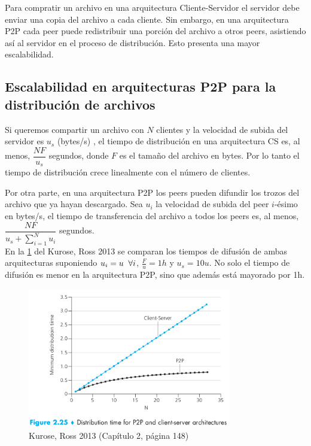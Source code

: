 \documentclass{article}
\begin{document}
Para compratir un archivo en una arquitectura Cliente-Servidor el
servidor debe enviar una copia del archivo a cada cliente. Sin
embargo, en una arquitectura P2P cada peer puede redistribuir una
porción del archivo a otros peers, asistiendo así al servidor en el
proceso de distribución. Esto presenta una mayor escalabilidad.

\subsection{Escalabilidad en arquitecturas P2P para la distribución de archivos}

Si queremos compartir un archivo con $N$ clientes y la velocidad de
subida del servidor es $u_s$ (bytes/s) , el tiempo de distribución en
una arquitectura CS es, al menos, $\dfrac{NF}{u_s}$ segundos, donde
$F$ es el tamaño del archivo en bytes. Por lo tanto el tiempo de
distribución crece linealmente con el número de clientes.

Por otra parte, en una arquitectura P2P los peers pueden difundir los trozos del archivo que ya hayan descargado. Sea $u_i$ la velocidad de subida del peer $i$-ésimo en bytes/s, el tiempo de transferencia del archivo a todos los peers es, al menos, $\dfrac{NF}{u_s+\sum\limits_{i=1}^{N}u_i}$ segundos.\\

En la \ref{fig:kurose,2.25} del Kurose, Ross 2013 se comparan los
tiempos de difusión de ambas arquitecturas suponiendo
$u_i=u \hspace{0.2cm} \forall i$, $\frac{F}{u} = 1 h$ y $u_s =
10u$. No solo el tiempo de difusión es menor en la arquitectura P2P,
sino que además está mayorado por 1h.  \vspace{-4mm}

\renewcommand\thefigure{Figura 2.25}
\begin{figure}[H]
  \centering
  \caption{Kurose, Ross 2013 (Capítulo 2, página 148)\vspace{-4mm}}
  \label{fig:kurose,2.25}
  \includegraphics[width=89mm]{imagenes/Escalabilidad}
\end{figure}
\end{document}
